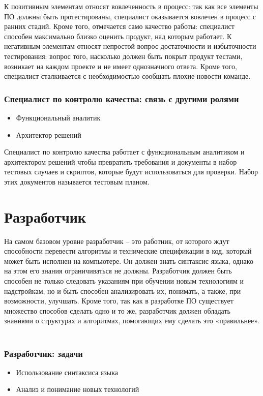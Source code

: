 \documentclass{../industrial-development}
\begin{document}
\lecturenotes

К позитивным элементам относят вовлеченность в процесс: так как все элементы ПО должны быть протестированы, специалист оказывается вовлечен в процесс с ранних стадий. Кроме того, отмечается само качество работы: специалист способен максимально близко оценить продукт, над которым работает. 
К негативным элементам относят непростой вопрос достаточности и избыточности тестирования: вопрос того, насколько должен быть покрыт продукт тестами, возникает на каждом проекте и не имеет однозначного ответа. Кроме того, специалист сталкивается с необходимостью сообщать плохие новости команде.  ~\cite{Anatomy}

\begin{frame} \frametitle{Специалист по контролю качества: связь с другими ролями}
  \begin{itemize}
	\item Функциональный аналитик
	\item Архитектор решений
	\end{itemize}
\end{frame}
\lecturenotes
Специалист по контролю качества работает с функциональным аналитиком и архитектором решений чтобы превратить требования и документы в набор тестовых случаев и скриптов, которые будут использоваться для проверки. Набор этих документов называется тестовым планом.  ~\cite{Anatomy}

\section{Разработчик }

\lecturenotes

На самом базовом уровне разработчик – это работник, от которого ждут способности перевести алгоритмы и технические спецификации в код, который может быть исполнен на компьютере. Он должен знать синтаксис языка, однако на этом его знания ограничиваться не должны. Разработчик должен быть способен не только следовать указаниям при обучении новым технологиям и надстройкам, но и быть способен анализировать их, понимать, а также, при возможности, улучшать. Кроме того, так как в разработке ПО существует множество способов сделать одно и то же, разработчик должен обладать знаниями о структурах и алгоритмах, помогающих ему сделать это «правильнее».   ~\cite{Anatomy}

\begin{frame} \frametitle{Разработчик: задачи}
  \begin{itemize}
	\item Использование синтаксиса языка
	\item Анализ и понимание новых технологий
	\end{itemize}
\end{frame}
\end{document}
